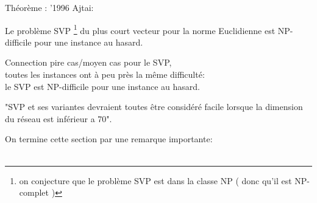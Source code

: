 Théorème : '1996 Ajtai:

Le problème SVP \footnote{on conjecture que le problème SVP est dans la classe NP ( donc qu'il est NP-complet )} du plus court vecteur pour la norme Euclidienne est NP-difficile pour une instance au hasard.
\begin{center}
Connection pire cas/moyen cas pour le SVP,\\ toutes les instances ont à peu près la même difficulté:\\ le SVP est NP-difficile pour une instance au hasard.\\
\end{center}

"SVP et ses variantes devraient toutes être considéré facile lorsque la dimension du réseau est inférieur a 70". 
\newpage

On termine cette section par une remarque importante:
\\
\\

